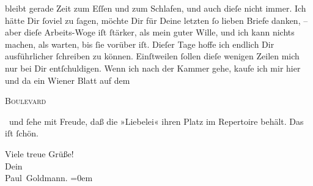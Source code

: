                bleibt gerade Zeit zum Eſſen und zum Schlafen, und auch dieſe nicht immer. Ich hätte Dir ſoviel zu ſagen, möchte Dir für Deine
               letzten ſo lieben Briefe danken, – aber dieſe Arbeits-Woge iſt ſtärker, als mein
               guter Wille, und ich kann nichts machen, als warten, bis ſie vorüber iſt. Dieſer Tage
               hoffe ich endlich Dir ausführlicher ſchreiben zu können. Einſtweilen ſollen dieſe
               wenigen Zeilen mich nur bei Dir entſchuldigen. Wenn ich nach der Kammer gehe, kaufe ich mir hier und da ein
                  Wiener Blatt auf dem \begin{otherlanguage}{french}\textsc{Boulevard}\end{otherlanguage} und ſehe mit Freude, daß die »Liebelei«  ihren {\pb}Platz im Repertoire behält. \strikeout{\textcolor{gray}{×}\-\textcolor{gray}{×}\-\textcolor{gray}{×}\-\textcolor{gray}{×}\-\textcolor{gray}{×}} Das iſt ſchön.\pend
           
\pstart
           Viele treue Grüße! {\\[\baselineskip]}Dein {\\[\baselineskip]}\spacefill\mbox{Paul Goldmann.}\pend
           \leftskip=0em{}\endnumbering{}  
      